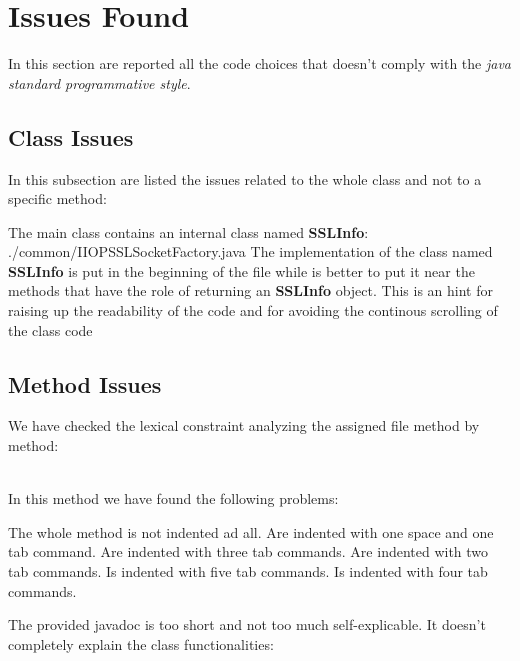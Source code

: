 \section{Issues Found}
\configureJava{}
In this section are reported all the code choices that doesn't comply with the \textit{java standard programmative style}.
\subsection{Class Issues}
In this subsection are listed the issues related to the whole class and not to a specific method:
\begin{itemize}
	 The main class contains an internal class named \textbf{SSLInfo}:
	{./common/IIOPSSLSocketFactory.java}
	 The implementation of the class named \textbf{SSLInfo} is put in the beginning of the file while is better to put it near the methods that have the role of returning an \textbf{SSLInfo} object. This is an hint for raising up the readability of the code and for avoiding the continous scrolling of the class code
\end{itemize}
\subsection{Method Issues}
We have checked the lexical constraint analyzing the assigned file method by method:
\begin{itemize}
	\\
	In this method we have found the following problems:
	\begin{itemize}
		\begin{itemize}
			 The whole method is not indented ad all.
			 Are indented with one space and one tab command.
			 Are indented with three tab commands.
			 Are indented with two tab commands.
			 Is indented with five tab commands.
			 Is indented with four tab commands.
		\end{itemize}
		 The provided javadoc is too short and not too much self-explicable. It doesn't completely explain the class functionalities:
	\end{itemize}
\end{itemize}